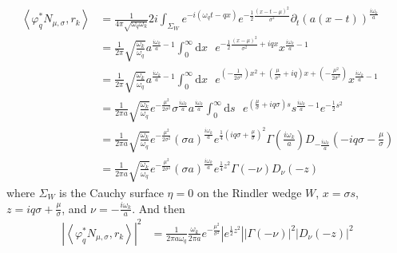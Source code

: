 \documentclass[12pt,a4paper]{article}
\newcommand{\dv}[1]{\mathrm{d} #1 \text{ }}
\begin{document}
{\begin{equation}
  \begin{aligned}
    \left< \varphi_q^* N_{\mu,\sigma}, r_k\right> &= \frac{1}{4\pi \sqrt{\omega_q \omega_k}} 2i \int_{\Sigma_W} e^{-i(\omega_q t - q x)} e^{-\frac{1}{2} \frac{(x-t-\mu)^2}{\sigma^2}} \partial_t (a(x-t))^\frac{i\omega_k}{a} \\
    &= \frac{1}{2\pi} \sqrt{\frac{\omega_k}{\omega_q}} a^{\frac{i \omega_k}{a} - 1} \int_0^\infty  \dv{x} e^{-\frac{1}{2} \frac{(x-\mu)^2}{\sigma^2} + i q x} x^{\frac{i\omega_k}{a} - 1} \\
    &= \frac{1}{2\pi} \sqrt{\frac{\omega_k}{\omega_q}} a^{\frac{i \omega_k}{a} - 1} \int_0^\infty \dv{x} e^{\left(-\frac{1}{2\sigma^2}\right) x^2 + \left(\frac{\mu}{\sigma^2} + i q \right) x + \left( -\frac{\mu^2}{2\sigma^2}\right)} x^{\frac{i\omega_k}{a} - 1}  \\
    &= \frac{1}{2\pi a} \sqrt{\frac{\omega_k}{\omega_q}} e^{-\frac{\mu^2}{2 \sigma^2}} \sigma^{\frac{i\omega_k}{a}} a^{\frac{i \omega_k}{a} }  \int_0^\infty \dv{s} e^{(\frac{\mu}{\sigma} + i q \sigma)s} s^{\frac{i\omega_k}{a} - 1} e^{-\frac{1}{2} s^2} \\
    &= \frac{1}{2\pi a} \sqrt{\frac{\omega_k}{\omega_q}} e^{-\frac{\mu^2}{2 \sigma^2}} {(\sigma a)}^{\frac{i \omega_k}{a}} e^{\frac{1}{4}(i q \sigma + \frac{\mu}{\sigma})^2} \Gamma\left(\frac{i\omega_k}{a}\right) D_{-\frac{i\omega_k}{a}}(-i q\sigma - \frac{\mu}{\sigma}) \\
    &=  \frac{1}{2\pi a } \sqrt{\frac{\omega_k}{\omega_q}} e^{-\frac{\mu^2}{2 \sigma^2}}  (\sigma a)^\frac{i\omega_k}{a} e^{\frac{1}{4} z^2} \Gamma(-\nu) D_\nu(-z)
  \end{aligned}
\end{equation}
where $\Sigma_W$ is the Cauchy surface $\eta=0$ on the Rindler wedge $W$,  $x = \sigma s$, $z = i q \sigma + \frac{\mu}{\sigma}$, and $\nu = -\frac{i \omega_k}{a}$. And then
\begin{equation}
  \begin{aligned}
    \left|\left< \varphi^*_q N_{\mu,\sigma}, r_k \right>\right|^2 &= \frac{1}{2\pi a \omega_q} \frac{\omega_k}{2\pi a} e^{-\frac{\mu^2}{\sigma^2}} \left| e^{\frac{1}{2} z^2} \right| \left| \Gamma(-\nu) \right|^2 \left| D_\nu(-z) \right|^2 \\
  \end{aligned}
\label{pcf}
\end{equation}
\begin{figure}[h]
\centering

\end{figure}}
\end{document}

